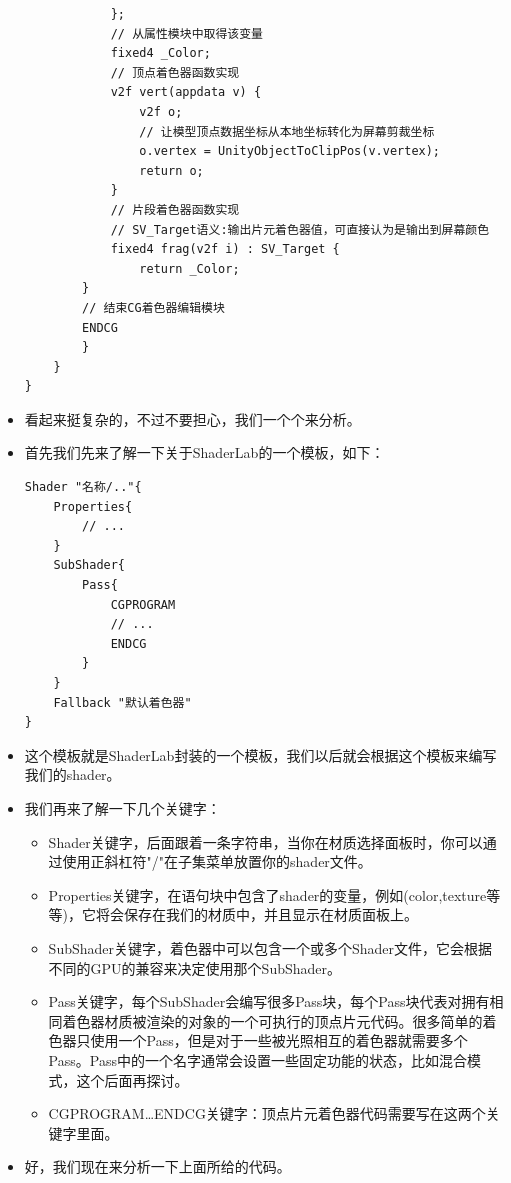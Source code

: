 \documentclass[9pt, b5paper]{article}
\begin{document}
\begin{itemize}
\begin{verbatim}
            };  
            // 从属性模块中取得该变量  
            fixed4 _Color;  
            // 顶点着色器函数实现  
            v2f vert(appdata v) {  
                v2f o;  
                // 让模型顶点数据坐标从本地坐标转化为屏幕剪裁坐标  
                o.vertex = UnityObjectToClipPos(v.vertex);
                return o;  
            }  
            // 片段着色器函数实现  
            // SV_Target语义:输出片元着色器值，可直接认为是输出到屏幕颜色
            fixed4 frag(v2f i) : SV_Target {  
                return _Color;  
        }  
        // 结束CG着色器编辑模块  
        ENDCG  
        }  
    }  
}
\end{verbatim}
\item 看起来挺复杂的，不过不要担心，我们一个个来分析。
\item 首先我们先来了解一下关于ShaderLab的一个模板，如下：
\begin{verbatim}
Shader "名称/.."{  
    Properties{  
        // ...  
    }  
    SubShader{  
        Pass{  
            CGPROGRAM  
            // ...  
            ENDCG  
        }  
    }  
    Fallback "默认着色器"  
}
\end{verbatim}
\item 这个模板就是ShaderLab封装的一个模板，我们以后就会根据这个模板来编写我们的shader。
\item 我们再来了解一下几个关键字：
\begin{itemize}
\item Shader关键字，后面跟着一条字符串，当你在材质选择面板时，你可以通过使用正斜杠符"/"在子集菜单放置你的shader文件。
\item Properties关键字，在语句块中包含了shader的变量，例如(color,texture等等)，它将会保存在我们的材质中，并且显示在材质面板上。
\item SubShader关键字，着色器中可以包含一个或多个Shader文件，它会根据不同的GPU的兼容来决定使用那个SubShader。
\item Pass关键字，每个SubShader会编写很多Pass块，每个Pass块代表对拥有相同着色器材质被渲染的对象的一个可执行的顶点片元代码。很多简单的着色器只使用一个Pass，但是对于一些被光照相互的着色器就需要多个Pass。Pass中的一个名字通常会设置一些固定功能的状态，比如混合模式，这个后面再探讨。
\item CGPROGRAM\ldots{}ENDCG关键字：顶点片元着色器代码需要写在这两个关键字里面。
\end{itemize}
\item 好，我们现在来分析一下上面所给的代码。
\begin{verbatim}

\end{verbatim}
\end{itemize}
\end{document}
